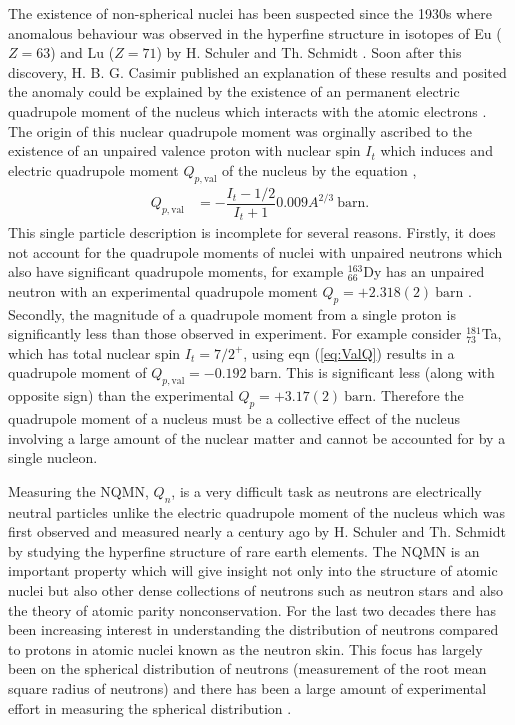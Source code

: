 \documentclass[10pt,a4paper, twoside]{report}
\begin{document}
The existence of non-spherical nuclei has been suspected since the 1930s where anomalous behaviour was observed in the hyperfine structure in isotopes of Eu ($Z=63$) and Lu ($Z=71$) by H. Schuler and Th. Schmidt \cite{Schuler1935(1), Schuler1935(2)}. Soon after this discovery, H. B. G. Casimir published an explanation of these results and posited the anomaly could be explained by the existence of an permanent electric quadrupole moment of the nucleus which interacts with the atomic electrons \cite{Casimir1935, Casimir1936}. The origin of this nuclear quadrupole moment was orginally ascribed to the existence of an unpaired valence proton with nuclear spin $I_t$ which induces and electric quadrupole moment  $Q_{p,\text{val}}$ of the nucleus by the equation \cite{BohrMottVol1},
\begin{align}\label{eq:valQ}
Q_{p,\text{val}} &=  - \dfrac{I_t-1/2}{I_t + 1}0.009A^{2/3} \ \text{barn}.
\end{align}  
This single particle description is incomplete for several reasons. Firstly, it does not account for the quadrupole moments of nuclei with unpaired neutrons which also have significant quadrupole moments, for example $^{163}_{66}$Dy has an unpaired neutron with an experimental quadrupole moment $Q_p = +2.318(2) \ \text{barn}$ \cite{Stone2005}. Secondly, the magnitude of a quadrupole moment from a single proton is significantly less than those observed in experiment. For example consider $^{181}_{73}$Ta, which has total nuclear spin $I_t=7/2^{+}$, using eqn (\ref{eq:ValQ}) results in a quadrupole moment of $Q_{p,\text{val}} = -0.192 \ \text{barn}$. This is significant less (along with opposite sign) than the experimental $Q_p = +3.17(2) \ \text{barn}$. Therefore the quadrupole moment of a nucleus must be a collective effect of the nucleus involving a large amount of the nuclear matter and cannot be accounted for by a single nucleon. 

Measuring the NQMN, $Q_{n}$,  is a very difficult  task as neutrons are electrically neutral particles unlike the electric quadrupole moment of the nucleus which was first observed and measured nearly a century ago by H. Schuler and Th. Schmidt \cite{Schuler1935(1), Schuler1935(2), Casimir1935} by studying the hyperfine structure of rare earth elements. The NQMN is an important property which will give insight not only into the structure of  atomic nuclei but also other dense collections of neutrons such as neutron stars \cite{Brown2000, Furnstahl2002, Typel2001, Reinhard2010} and also the theory of atomic parity nonconservation. For the last two decades there has been increasing interest in understanding the distribution of neutrons compared to protons in atomic nuclei known as the neutron skin. This focus has largely been on the spherical distribution of neutrons (measurement of the root mean square radius of neutrons) and there has been a large amount of experimental effort in measuring the spherical distribution \cite{Clark2003, Trzcinska2001, Lenske2009, Abrahamyan2012}. 
\end{document}
